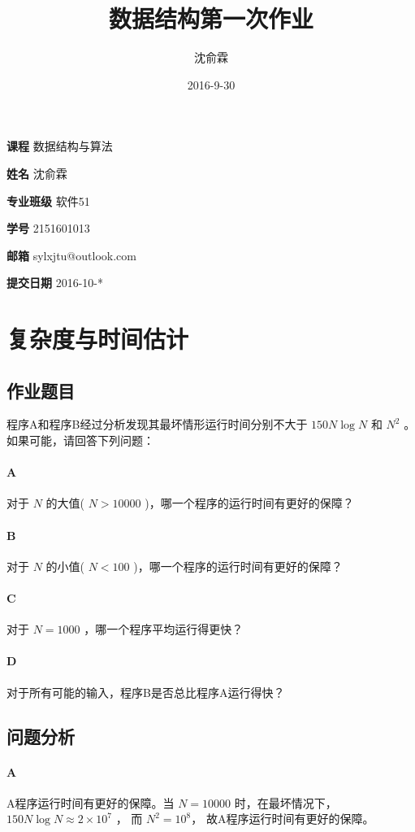\documentclass[UTF8]{ctexart}
\title{数据结构第一次作业}
\date{2016-9-30}
\author{沈俞霖}
\begin{document}
  \maketitle
  \vspace{100mm}
  \begin{flushright}
  \textbf{课程} 数据结构与算法

  \textbf{姓名} 沈俞霖

  \textbf{专业班级} 软件51

  \textbf{学号} 2151601013

  \textbf{邮箱} sylxjtu@outlook.com

  \textbf{提交日期} 2016-10-*
  \end{flushright}
  \newpage

  \tableofcontents
  \newpage

  \section{复杂度与时间估计}
    \subsection{作业题目}
      程序A和程序B经过分析发现其最坏情形运行时间分别不大于 $150N\log N$ 和 $N^2$ 。如果可能，请回答下列问题：
      \paragraph{A}
      对于 $N$ 的大值( $N>10000$ )，哪一个程序的运行时间有更好的保障？
      \paragraph{B}
      对于 $N$ 的小值( $N<100$ )，哪一个程序的运行时间有更好的保障？
      \paragraph{C}
      对于 $N=1000$ ，哪一个程序平均运行得更快？
      \paragraph{D}
      对于所有可能的输入，程序B是否总比程序A运行得快？
    \subsection{问题分析}
      \paragraph{A}
      A程序运行时间有更好的保障。当 $N=10000$ 时，在最坏情况下， $ 150 N \log N \approx 2 \times 10 ^ 7 $ ， 而 $ N^2 = 10 ^ 8 $， 故A程序运行时间有更好的保障。
\end{document}
